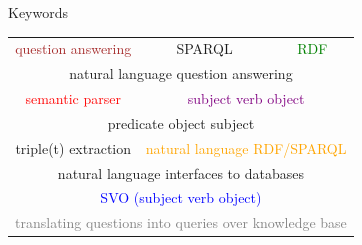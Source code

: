 \documentclass[10pt]{beamer}
\begin{document}
\begin{frame}{Keywords}

\begin{table}
\Large
\centering
\begin{tabular}{ccc}
	\textcolor{brown}{question answering} & SPARQL & \textcolor{green}{RDF} \\
	\multicolumn{3}{c}{natural language question answering} \\ 
	\textcolor{red}{semantic parser} & \multicolumn{2}{c}{\textcolor{purple}{subject verb object}} \\
	\multicolumn{3}{c}{predicate object subject} \\
	triple(t) extraction & \multicolumn{2}{c}{\textcolor{orange}{natural language RDF/SPARQL}} \\
	\multicolumn{3}{c}{natural language interfaces to databases} \\
	\multicolumn{3}{c}{\textcolor{blue}{SVO (subject verb object)}} \\
	\multicolumn{3}{c}{\textcolor{gray}{translating questions into queries over knowledge base}}
\end{tabular}
\end{table}

\end{frame}

\end{document}
